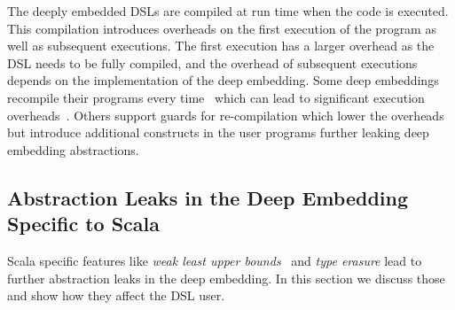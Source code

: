 The deeply embedded DSLs are compiled at run time when the code is executed. This compilation
 introduces overheads on the first execution of the program as well as subsequent executions. The first execution
 has a larger overhead as the DSL needs to be fully compiled, and the overhead of subsequent
 executions depends on the implementation of the deep embedding. Some deep embeddings
 recompile their programs every time~\cite{rompf2012lightweight,slick} which can lead to significant
 execution overheads~\cite{amirs_thesis}. Others support guards for re-compilation which lower
 the overheads but introduce additional constructs in the user programs further
 leaking deep embedding abstractions.


\subsection{Abstraction Leaks in the Deep Embedding Specific to Scala}
\label{sec:scala-specific-problems}

Scala specific features like \emph{weak least upper bounds}~\cite{odersky_scala_2004}
 and \emph{type erasure} lead to further abstraction leaks in the deep embedding.
 In this section we discuss those and show how they affect the DSL user.

